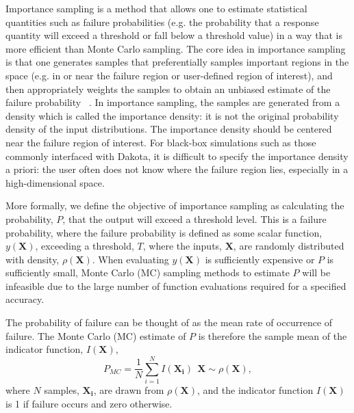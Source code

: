 Importance sampling is a method that allows one to estimate statistical
quantities such as failure probabilities (e.g. the probability that
a response quantity will exceed a threshold or fall below a threshold value)
in a way that is more efficient than Monte Carlo sampling. The core idea
in importance sampling is that one generates samples that preferentially
samples important regions in the space (e.g. in or near the failure region
or user-defined region of interest), and then appropriately weights
the samples to obtain an unbiased estimate of the failure probability
~\cite{Srinivasan2002}.
In importance sampling, the samples are generated from a density which is
called the importance density:  it is not the original probability density
of the input distributions. The importance density should be centered near the
failure region of interest. For black-box simulations such as those commonly
interfaced with Dakota, it is difficult to specify the importance density a priori:
the user often does not know where the failure region lies, especially in a high-dimensional
space.~\cite{Swiler2010}

More formally, we define the objective of importance sampling as calculating the probability, $P$, that the output will exceed a threshold level. This is a failure 
probability, where the failure probability is defined as some scalar function, 
$y\left(\textbf{X}\right)$, exceeding a threshold, $T$, 
where the inputs, $\textbf{X}$, are randomly distributed with density, $\rho\left(\textbf{X}\right)$. 
When evaluating $y\left(\textbf{X}\right)$ is sufficiently expensive or $P$ is sufficiently small, Monte Carlo (MC) sampling methods to estimate $P$ will be infeasible due to the large number of function evaluations required
for a specified accuracy. 

The probability of failure can be thought of as the mean rate of occurrence
of failure. The Monte Carlo (MC) estimate of $P$ is therefore the sample
mean of the indicator function, $I\left(\textbf{X}\right)$,
\begin{equation}
P_{MC}=\frac{1}{N}\sum_{i=1}^{N}I\left(\mathbf{X_i}\right)\ \ \textbf{X}\sim \rho\left(\textbf{X}\right),
\label{mc_ind}
\end{equation}
where $N$ samples, $\mathbf{X_i}$, are drawn from
$\rho\left(\textbf{X}\right)$,
and the indicator function $I\left(\textbf{X}\right)$
is 1 if failure occurs and zero otherwise.


